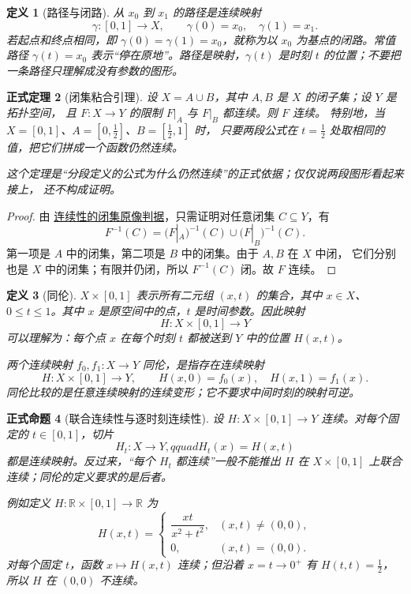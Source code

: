 \documentclass[UTF8,fontset=none,a4paper,11pt]{ctexart}
\theoremstyle{foundation-definition}
\newtheorem{definition}{定义}[section]
\theoremstyle{foundation-theorem}
\newtheorem{theorem}[definition]{正式定理}
\theoremstyle{foundation-proposition}
\newtheorem{proposition}[definition]{正式命题}
\theoremstyle{foundation-example}
\theoremstyle{foundation-remark}
\theoremstyle{foundation-theorem}
\newcommand{\term}[2]{\hyperref[#1]{#2}}
\begin{document}
\begin{definition}[路径与闭路]\label{def:path-loop}
从 \(x_0\) 到 \(x_1\) 的路径是连续映射
\[
\gamma:[0,1]\to X,\qquad \gamma(0)=x_0,\quad\gamma(1)=x_1.
\]
若起点和终点相同，即 \(\gamma(0)=\gamma(1)=x_0\)，就称为以 \(x_0\) 为基点的闭路。常值路径 \(\gamma(t)=x_0\) 表示“停在原地”。路径是映射，\(\gamma(t)\) 是时刻 \(t\) 的位置；不要把一条路径只理解成没有参数的图形。
\end{definition}

\begin{theorem}[闭集粘合引理]
\label{thm:pasting-lemma}
设 $X=A\cup B$，其中 $A,B$ 是 $X$ 的闭子集；设 $Y$ 是拓扑空间，
且 $F:X\to Y$ 的限制 $F|_A$ 与 $F|_B$ 都连续。则 $F$ 连续。
特别地，当 $X=[0,1]$、$A=[0,\tfrac12]$、$B=[\tfrac12,1]$ 时，
只要两段公式在 $t=\tfrac12$ 处取相同的值，把它们拼成一个函数仍然连续。

这个定理是“分段定义的公式为什么仍然连续”的正式依据；仅仅说两段图形看起来接上，
还不构成证明。
\end{theorem}

\begin{proof}
由 \term{prop:continuous-closed-preimage}{连续性的闭集原像判据}，只需证明对任意闭集 $C\subseteq Y$，有
\[
 F^{-1}(C)=\bigl(F|_A\bigr)^{-1}(C)\cup\bigl(F|_B\bigr)^{-1}(C).
\]
第一项是 $A$ 中的闭集，第二项是 $B$ 中的闭集。由于 $A,B$ 在 $X$ 中闭，
它们分别也是 $X$ 中的闭集；有限并仍闭，所以 $F^{-1}(C)$ 闭。故 $F$ 连续。
\end{proof}

\begin{definition}[同伦]\label{def:homotopy}
\(X\times[0,1]\) 表示所有二元组 \((x,t)\) 的集合，其中 \(x\in X\)、\(0\leq t\leq1\)。其中 \(x\) 是原空间中的点，\(t\) 是时间参数。因此映射
\[
H:X\times[0,1]\to Y
\]
可以理解为：每个点 \(x\) 在每个时刻 \(t\) 都被送到 \(Y\) 中的位置 \(H(x,t)\)。

两个连续映射 \(f_0,f_1:X\to Y\) 同伦，是指存在连续映射
\[
H:X\times[0,1]\to Y,\qquad H(x,0)=f_0(x),\quad H(x,1)=f_1(x).
\]
同伦比较的是任意连续映射的连续变形；它不要求中间时刻的映射可逆。
\end{definition}

\begin{proposition}[联合连续性与逐时刻连续性]
\label{prop:homotopy-joint-continuity}
设 $H:X\times[0,1]\to Y$ 连续。对每个固定的 $t\in[0,1]$，切片
\[
 H_t:X\to Y,qquad H_t(x)=H(x,t)
\]
都是连续映射。反过来，“每个 $H_t$ 都连续”一般不能推出 $H$ 在
$X\times[0,1]$ 上联合连续；同伦的定义要求的是后者。

例如定义 $H:\mathbb R\times[0,1]\to\mathbb R$ 为
\[
H(x,t)=
\begin{cases}
\dfrac{xt}{x^2+t^2},&(x,t)\ne(0,0),\\[0.5em]
0,&(x,t)=(0,0).
\end{cases}
\]
对每个固定 $t$，函数 $x\mapsto H(x,t)$ 连续；但沿着 $x=t\to0^+$ 有
$H(t,t)=\tfrac12$，所以 $H$ 在 $(0,0)$ 不连续。
\end{proposition}
\end{document}
